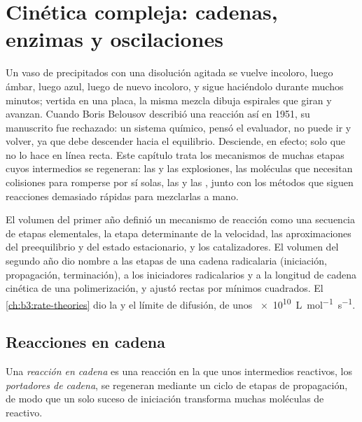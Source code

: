 \chapter{Cinética compleja: cadenas, enzimas y oscilaciones}\label{ch:b3:complex-kinetics}

Un vaso de precipitados con una disolución agitada se vuelve incoloro, luego ámbar, luego azul, luego
de nuevo incoloro, y sigue haciéndolo durante muchos minutos; vertida en una placa, la
misma mezcla dibuja espirales que giran y avanzan. Cuando Boris Belousov
describió una reacción así en 1951, su manuscrito fue rechazado: un sistema
químico, pensó el evaluador, no puede ir y volver, ya que debe descender
hacia el equilibrio. Desciende, en efecto; solo que no lo hace en línea
recta. Este capítulo trata los mecanismos de muchas etapas cuyos intermedios
se regeneran: las  y las explosiones, las moléculas que necesitan
colisiones para romperse por sí solas, las  y las , junto con
los métodos que siguen reacciones demasiado rápidas para mezclarlas a mano.

\begin{recall}
El volumen del primer año definió un mecanismo de reacción como una secuencia de etapas
elementales, la etapa determinante de la velocidad, las aproximaciones del preequilibrio y del estado
estacionario, y los catalizadores. El volumen del segundo año dio nombre a las etapas de una cadena
radicalaria (iniciación, propagación, terminación), a los iniciadores radicalarios y a la
longitud de cadena cinética de una polimerización, y ajustó rectas por mínimos cuadrados.
El \cref{ch:b3:rate-theories} dio la  y el límite de difusión,
de unos \qty{e10}{L.mol^{-1}.s^{-1}}.
\end{recall}

\section{Reacciones en cadena}

\begin{definition}\label{def:b3:complex-kinetics:chain}
Una \emph{reacción en cadena} es una reacción en la que unos intermedios
reactivos, los \emph{portadores de cadena}, se regeneran mediante
un ciclo de etapas de propagación, de modo que un solo suceso de iniciación transforma muchas
moléculas de reactivo.
\end{definition}

